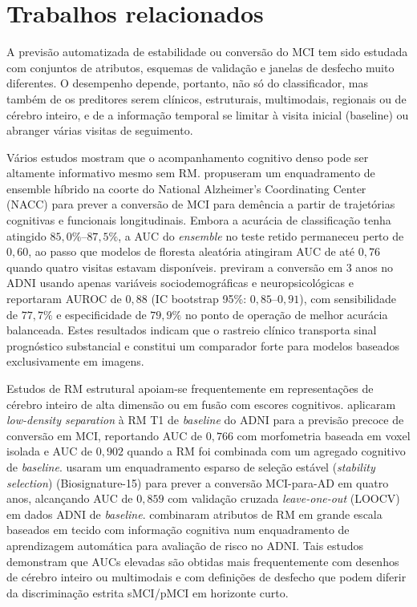 \documentclass[review]{elsarticle}
\begin{document}
\section{Trabalhos relacionados}\label{sec:Related-Works}

	A previsão automatizada de estabilidade ou conversão do MCI tem sido estudada com conjuntos de atributos, esquemas de validação e janelas de desfecho muito diferentes. O desempenho depende, portanto, não só do classificador, mas também de os preditores serem clínicos, estruturais, multimodais, regionais ou de cérebro inteiro, e de a informação temporal se limitar à visita inicial (baseline) ou abranger várias visitas de seguimento.
	
	Vários estudos mostram que o acompanhamento cognitivo denso pode ser altamente informativo mesmo sem RM. \citet{bucholc-2023} propuseram um enquadramento de ensemble híbrido na coorte do National Alzheimer's Coordinating Center (NACC) para prever a conversão de MCI para demência a partir de trajetórias cognitivas e funcionais longitudinais. Embora a acurácia de classificação tenha atingido $85,0\%$--$87,5\%$, a AUC do \emph{ensemble} no teste retido permaneceu perto de $0,60$, ao passo que modelos de floresta aleatória atingiram AUC de até $0,76$ quando quatro visitas estavam disponíveis. \citet{grassi-2019} previram a conversão em 3 anos no ADNI usando apenas variáveis sociodemográficas e neuropsicológicas e reportaram AUROC de $0,88$ (IC bootstrap 95\%: $0,85$--$0,91$), com sensibilidade de $77,7\%$ e especificidade de $79,9\%$ no ponto de operação de melhor acurácia balanceada. Estes resultados indicam que o rastreio clínico transporta sinal prognóstico substancial e constitui um comparador forte para modelos baseados exclusivamente em imagens.
	
	Estudos de RM estrutural apoiam-se frequentemente em representações de cérebro inteiro de alta dimensão ou em fusão com escores cognitivos. \citet{moradi-2015} aplicaram \emph{low-density separation} à RM T1 de \textit{baseline} do ADNI para a previsão precoce de conversão em MCI, reportando AUC de $0,766$ com morfometria baseada em voxel isolada e AUC de $0,902$ quando a RM foi combinada com um agregado cognitivo de \textit{baseline}. \citet{ye-2012} usaram um enquadramento esparso de seleção estável (\emph{stability selection}) (Biosignature-15) para prever a conversão MCI-para-AD em quatro anos, alcançando AUC de $0,859$ com validação cruzada \emph{leave-one-out} (LOOCV) em dados ADNI de \textit{baseline}. \citet{casanova-2013} combinaram atributos de RM em grande escala baseados em tecido com informação cognitiva num enquadramento de aprendizagem automática para avaliação de risco no ADNI. Tais estudos demonstram que AUCs elevadas são obtidas mais frequentemente com desenhos de cérebro inteiro ou multimodais e com definições de desfecho que podem diferir da discriminação estrita sMCI/pMCI em horizonte curto.
	
\end{document}
